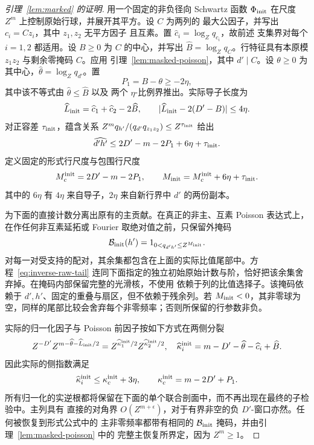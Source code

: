 \documentclass[11pt,a4paper]{article}
\numberwithin{equation}{section}
\numberwithin{figure}{section}
\theoremstyle{definition}
\theoremstyle{remark}
\begin{document}
\begin{proof}[引理~\ref{lem:marked} 的证明]
用一个固定的非负径向 Schwartz
函数 \(\Phi_{\rm init}\) 在尺度 \(Z^m\) 上控制原始行球，并展开其平方。设 \(C\) 为两列的
最大公因子，并写出 \(c_i=Cz_i\)，其中 \(z_1,z_2\) 无平方因子
且互素。置 \(\widehat c_i=\log_Zq_{c_i}\)，故前述
支集界对每个 \(i=1,2\) 都适用。设 \(B\ge0\) 为 \(C\) 的中心，并写出
\(\widehat B=\log_Zq_C\)。行特征具有本原模
\(z_1z_2\) 与剩余零掩码 \(C\)。应用
引理~\ref{lem:masked-poisson}，其中 \(d'\mid C\)。设 \(\theta\ge0\)
为其中心，\(\widehat\theta=\log_Zq_{d'}\)。置
\[
 P_1=B-\theta\ge-2\eta,
\]
其中该不等式由 \(\widehat\theta\le\widehat B\) 以及
两个 \(\eta\)-比例界推出。实际导子长度为
\[
 \widehat L_{\rm init}=\widehat c_1+\widehat c_2-2\widehat B,
 \qquad |\widehat L_{\rm init}-2(D'-B)|\le4\eta.
\]
对正容差 \(\tau_{\rm init}\)，蕴含关系
\(Z^mq_{h'}/(q_{d'}q_{z_1z_2})\le Z^{\tau_{\rm init}}\) 给出
\[
 \widehat{d'h'}\le2D'-m-2P_1+6\eta+\tau_{\rm init}.
\]
定义固定的形式行尺度与包围行尺度
\begin{equation}\label{eq:inverse-initial-row}
 M_c^{\rm init}=2D'-m-2P_1,\qquad
 M_{\rm init}=M_c^{\rm init}+6\eta+\tau_{\rm init}.
\end{equation}
其中的 \(6\eta\) 有 \(4\eta\) 来自导子，\(2\eta\) 来自新行界中 \(d'\) 的两份副本。

为下面的直接计数分离出原有的主贡献。在真正的非主、互素 Poisson 表达式上，
在作任何非互素延拓或 Fourier 取绝对值之前，只保留外掩码
\[
 \mathcal B_{\rm init}(h')=1_{0<q_{d'h'}\le Z^{M_{\rm init}}}.
\]
对每一对受支持的配对，其余集都包含在上面的实际比值尾部中。方程~\eqref{eq:inverse-raw-tail}
连同下面指定的独立初始原始计数与阶，恰好把该余集舍弃掉。在掩码内部保留完整的光滑核，不使用
依赖于列的比值选择子。该掩码依赖于 \(d',h'\)、固定的重叠与扇区，但不依赖于残余列。若
\(M_{\rm init}<0\)，其非零球为空，同样的尾部比较会舍弃每个非零频率；否则所保留的行参数非负。

实际的归一化因子与 Poisson 前因子按如下方式在两侧分裂
\[
 Z^{-D'}Z^{m-\widehat\theta-\widehat L_{\rm init}/2}
   =Z^{\widehat\kappa_1^{\rm init}/2}
      Z^{\widehat\kappa_2^{\rm init}/2},
 \quad
 \widehat\kappa_i^{\rm init}=m-D'-\widehat\theta-\widehat c_i+\widehat B.
\]
因此实际的侧指数满足
\begin{equation}\label{eq:initial-poisson-prefactor}
 \widehat\kappa_i^{\rm init}\le\kappa_c^{\rm init}+3\eta,
 \qquad \kappa_c^{\rm init}=m-2D'+P_1.
\end{equation}
所有归一化的实逆根都将保留在下面的单个联合剖面中，而不再出现在最终的子检验中。主列具有
直接的对角界 \(O(Z^{m+\epsilon})\)，对于有界非空的负 \(D'\)-窗口亦然。任何被恢复到形式公式中的
主非零频率都带有相同的 \(\mathcal B_{\rm init}\) 掩码，并由引理~\ref{lem:masked-poisson} 中的
完整主恢复所界定，因为 \(Z^m\ge1\)。


\end{proof}
\end{document}
